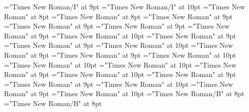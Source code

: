 \documentclass[gps1,twoside]{article}
\begin{document}
\font\translationaftertranslationspanexampleexampleexamplessensesensessensesensesentryexamplespansensespanspandiventryletData="Times New Roman/I" at 9pt
\font\spanentranslationtranslationspanexampleexampleexamplessensesensessensesensesentryexamplespansensespanspandiventryletData="Times New Roman/I" at 10pt
\font\exampleexampleexamplessensesensessensesensesentrybeforespansensespanspandiventryletData="Times New Roman" at 8pt
\font\exampleexampleexamplessensesensessensesensessubentrysubentriesentrybeforeexamplespansensespanspandiventryletData="Times New Roman" at 8pt
\font\semanticdomainssensesensesentrybeforesensespanspandiventryletData="Times New Roman" at 9pt
\font\semanticdomainssensesensesentryaftersensespanspandiventryletData="Times New Roman" at 9pt
\font\spanspansensespanspandiventryletData="Times New Roman" at 9pt
\font\spanspanspansensespanspandiventryletData="Times New Roman" at 9pt
\font\spanenspanspanspansensespanspandiventryletData="Times New Roman" at 10pt
\font\semanticdomainsemanticdomainsemanticdomainssensesensessensesensesentrybeforespansensespanspandiventryletData="Times New Roman" at 9pt
\font\picturesentryafterdiventryletData="Times New Roman" at 9pt
\font\picturepicturessubentrysubentriesentryspandiventryletData="Times New Roman" at 10pt
\font\picturepicturessubentrysubentriesentrypicturepicturessubentrysubentriesentryspandiventryletData="Times New Roman" at 9pt
\font\picturepicturessubentrysubentriesentryafterpicturepicturessubentrysubentriesentryspandiventryletData="Times New Roman" at 9pt
\font\sensenumberpicturepicturessubentrysubentriesentryspandiventryletData="Times New Roman" at 10pt
\font\spanensensenumberpicturepicturessubentrysubentriesentryspandiventryletData="Times New Roman" at 10pt
\font\captionpicturepicturessubentrysubentriesentryspandiventryletData="Times New Roman" at 10pt
\font\spancaptionpicturepicturessubentrysubentriesentryspandiventryletData="Times New Roman" at 9pt
\font\spanenspancaptionpicturepicturessubentrysubentriesentryspandiventryletData="Times New Roman" at 10pt
\font\scientificnamesensespanspandiventryletData="Times New Roman" at 9pt
\font\scientificnamesensesensesentryaftersensespanspandiventryletData="Times New Roman" at 9pt
\font\spanenscientificnamesensespanspandiventryletData="Times New Roman" at 10pt
\font\subentriesdiventryletData="Times New Roman" at 9pt
\font\subentrysubentriesentrysubentriesdiventryletData="Times New Roman" at 10pt
\font\headwordsubentrysubentriesentrysubentriesdiventryletData="Times New Roman/B" at 8pt
\font\headwordaftersubentrysubentriesentrysubentriesdiventryletData="Times New Roman/B" at 8pt
\end{document}
